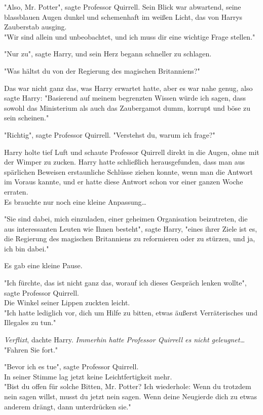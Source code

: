 {"Also, Mr. Potter", sagte Professor Quirrell. Sein Blick war abwartend, seine blassblauen Augen dunkel und schemenhaft im weißen Licht, das von Harrys Zauberstab ausging.\\ "Wir sind allein und unbeobachtet, und ich muss dir eine wichtige Frage stellen."

"Nur zu", sagte Harry, und sein Herz begann schneller zu schlagen.

"Was hältst du von der Regierung des magischen Britanniens?"

Das war nicht ganz das, was Harry erwartet hatte, aber es war nahe genug, also sagte Harry: "Basierend auf meinem begrenzten Wissen würde ich sagen, dass sowohl das Ministerium als auch das Zaubergamot dumm, korrupt und böse zu sein scheinen."

"Richtig", sagte Professor Quirrell. "Verstehst du, warum ich frage?"

Harry holte tief Luft und schaute Professor Quirrell direkt in die Augen, ohne mit der Wimper zu zucken. Harry hatte schließlich herausgefunden, dass man aus spärlichen Beweisen erstaunliche Schlüsse ziehen konnte, wenn man die Antwort im Voraus kannte, und er hatte diese Antwort schon vor einer ganzen Woche erraten.\\ Es brauchte nur noch eine kleine Anpassung…

"Sie sind dabei, mich einzuladen, einer geheimen Organisation beizutreten, die aus interessanten Leuten wie Ihnen besteht", sagte Harry, "eines ihrer Ziele ist es, die Regierung des magischen Britanniens zu reformieren oder zu stürzen, und ja, ich bin dabei."

Es gab eine kleine Pause.

"Ich fürchte, das ist nicht ganz das, worauf ich dieses Gespräch lenken wollte", sagte Professor Quirrell.\\ Die Winkel seiner Lippen zuckten leicht.\\ "Ich hatte lediglich vor, dich um Hilfe zu bitten, etwas äußerst Verräterisches und Illegales zu tun."

\emph{Verflixt}, dachte Harry. \emph{Immerhin hatte Professor Quirrell es nicht geleugnet…}\\ "Fahren Sie fort."

"Bevor ich es tue", sagte Professor Quirrell.\\ In seiner Stimme lag jetzt keine Leichtfertigkeit mehr.\\ "Bist du offen für solche Bitten, Mr. Potter? Ich wiederhole: Wenn du trotzdem nein sagen willst, musst du jetzt nein sagen. Wenn deine Neugierde dich zu etwas anderem drängt, dann unterdrücken sie."

}
